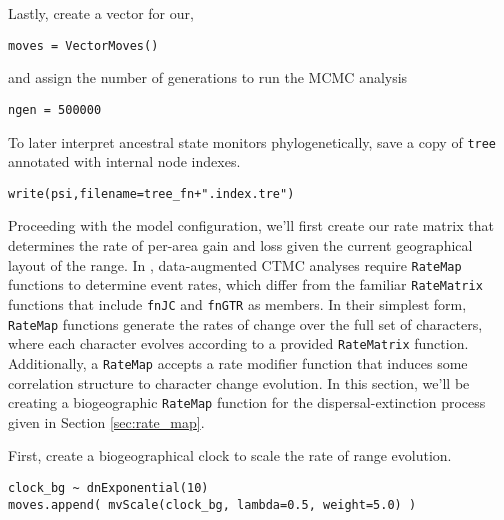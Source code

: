 Lastly, create a vector for our,

\begin{snugshade}
\begin{lstlisting}
moves = VectorMoves()
\end{lstlisting}
\end{snugshade}

and assign the number of generations to run the MCMC analysis

\begin{snugshade}
\begin{lstlisting}
ngen = 500000
\end{lstlisting}
\end{snugshade}

To later interpret ancestral state monitors phylogenetically, save a copy of {\tt tree} annotated with internal node indexes.

\begin{snugshade}
\begin{lstlisting}
write(psi,filename=tree_fn+".index.tre")
\end{lstlisting}
\end{snugshade}

Proceeding with the model configuration, we'll first create our rate matrix that determines the rate of per-area gain and loss given the current geographical layout of the range.
In \RevBayes, data-augmented CTMC analyses require {\tt RateMap} functions to determine event rates, which differ from the familiar {\tt RateMatrix} functions that include {\tt fnJC} and {\tt fnGTR} as members.
In their simplest form, {\tt RateMap} functions generate the rates of change over the full set of characters, where each character evolves according to a provided {\tt RateMatrix} function.
Additionally, a {\tt RateMap} accepts a rate modifier function that induces some correlation structure to character change evolution.
In this section, we'll be creating a biogeographic {\tt RateMap} function for the dispersal-extinction process given in Section \ref{sec:rate_map}.

First, create a biogeographical clock to scale the rate of range evolution.

\begin{snugshade}
\begin{lstlisting}
clock_bg ~ dnExponential(10)
moves.append( mvScale(clock_bg, lambda=0.5, weight=5.0) )
\end{lstlisting}
\end{snugshade}

